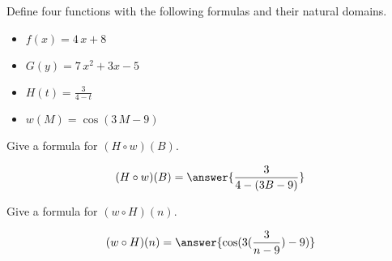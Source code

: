 \documentclass{ximera}
\author{Lee Wayand}
\begin{document}
\begin{exercise}




Define four functions with the following formulas and their natural domains. \\


\begin{itemize}
  \item $f(x) = 4 \, x + 8$
  \item $G(y) = 7 \, x^2 + 3 x - 5$
  \item $H(t) = \frac{3}{4 - t}$
  \item $w(M) = \cos(3 \, M - 9)$ 
\end{itemize}


\begin{question}


Give a formula for $(H \circ w)(B)$.

\[
(H \circ w)(B) = \answer{\frac{3}{4-(3B-9)}}
\]

\end{question}






\begin{question}


Give a formula for $(w \circ H)(n)$.

\[
(w \circ H)(n) = \answer{\cos(3(\frac{3}{n-9})-9)}
\]

\end{question}




\end{exercise}
\end{document}
